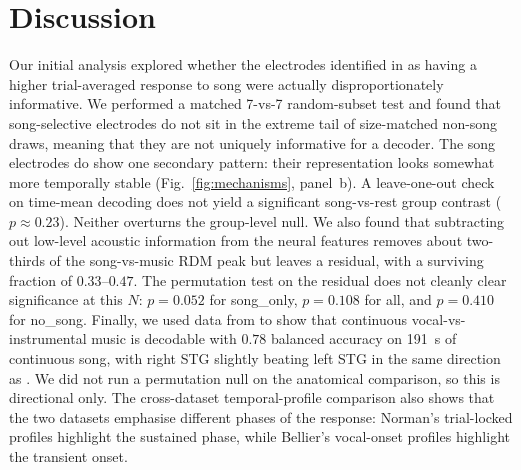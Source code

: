 \documentclass[11pt]{article}
\begin{document}
\FloatBarrier
\section{Discussion}\label{sec:discussion}

Our initial analysis explored whether the electrodes identified in \citet{NormanHaignere2022} as having a higher trial-averaged response to song were actually disproportionately informative. We performed a matched 7-vs-7 random-subset test and found that song-selective electrodes do not sit in the extreme tail of size-matched non-song draws, meaning that they are not uniquely informative for a decoder. The song electrodes do show one secondary pattern: their representation looks somewhat more temporally stable (Fig.~\ref{fig:mechanisms}, panel~b). A leave-one-out check on time-mean decoding does not yield a significant song-vs-rest group contrast ($p \approx 0.23$). Neither overturns the group-level null. We also found that subtracting out low-level acoustic information from the neural features removes about two-thirds of the song-vs-music RDM peak but leaves a residual, with a surviving fraction of $0.33$--$0.47$. The permutation test on the residual does not cleanly clear significance at this $N$: $p = 0.052$ for \textsf{song\_only}, $p = 0.108$ for \textsf{all}, and $p = 0.410$ for \textsf{no\_song}. Finally, we used data from \citet{Bellier2023} to show that continuous vocal-vs-instrumental music is decodable with $0.78$ balanced accuracy on 191~s of continuous song, with right STG slightly beating left STG in the same direction as \citet{Bellier2023}. We did not run a permutation null on the anatomical comparison, so this is directional only. The cross-dataset temporal-profile comparison also shows that the two datasets emphasise different phases of the response: Norman's trial-locked profiles highlight the sustained phase, while Bellier's vocal-onset profiles highlight the transient onset.
\end{document}
